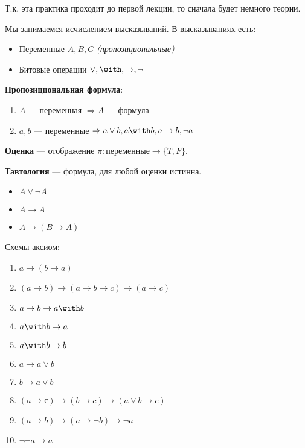 

\cfoot{}



Т.к. эта практика проходит до первой лекции, то сначала будет немного теории.

Мы занимаемся исчислением высказываний. В высказываниях есть:
\begin{itemize}
    \item Переменные \(A, B, C\) \textit{(пропозициональные)}
    \item Битовые операции \(\lor, \with, \to, \neg\)
\end{itemize}

\begin{definition}
    \textbf{Пропозициональная формула}:
    \begin{enumerate}
        \item \(A\) --- переменная \( \Rightarrow A\) --- формула
        \item \(a, b\) --- переменные \(\Rightarrow a \lor b, a \with b, a \to b, \neg a\)
    \end{enumerate}
\end{definition}

\begin{definition}
    \textbf{Оценка} --- отображение \(\pi : \text{переменные} \to \{T, F\} \).
\end{definition}

\begin{definition}
    \textbf{Тавтология} --- формула, для любой оценки истинна.
\end{definition}

\begin{example}\itemfix
    \begin{itemize}
        \item \(A \lor \neg A\)
        \item \(A \to A\)
        \item \(A \to (B \to A)\)
    \end{itemize}
\end{example}

Схемы аксиом:
\begin{enumerate}
    \item \(a \to (b \to a)\)
    \item \((a \to b) \to (a \to b \to c) \to (a \to c)\)
    \item \(a \to b \to a \with b\)
    \item \(a \with b \to a\)
    \item \(a \with b \to b\)
    \item \(a \to a \lor b\)
    \item \(b \to a \lor b\)
    \item \((a \to с) \to (b \to c) \to (a \lor b \to c)\)
    \item \((a \to b) \to (a \to \neg b) \to \neg a\)
    \item \(\neg \neg a \to a\)
\end{enumerate}

